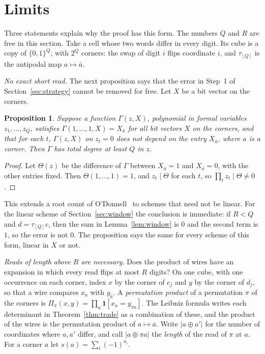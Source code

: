 \documentclass[11pt]{article}
\numberwithin{equation}{section}
\newtheorem{proposition}[theorem]{Proposition}
\theoremstyle{remark}
\newcommand{\bits}{\{0,1\}}
\begin{document}
\section{Limits}\label{sec:limits}

Three statements explain why the proof has this form. The numbers $Q$ and $R$ are free in this section. Take a cell whose two words differ in every digit. Its cube is a copy of $\bits^Q$, with $2^Q$ corners: the swap of digit $i$ flips coordinate $i$, and $\tau_{[Q]}$ is the antipodal map $a\mapsto\bar a$.

\emph{No exact short read.} The next proposition says that the error in Step~1 of Section~\ref{sec:strategy} cannot be removed for free. Let $X$ be a bit vector on the corners.

\begin{proposition}\label{prop:exact}
Suppose a function $\Gamma(z,X)$, polynomial in formal variables $z_1,\dots,z_Q$, satisfies $\Gamma(1,\dots,1,X)=X_{\bar a}$ for all bit vectors $X$ on the corners, and that for each $t$, $\Gamma(z,X)$ on $z_t=0$ does not depend on the entry $X_{\bar a}$, where $a$ is a corner. Then $\Gamma$ has total degree at least $Q$ in $z$.
\end{proposition}
\begin{proof}
Let $\Theta(z)$ be the difference of $\Gamma$ between $X_{\bar a}=1$ and $X_{\bar a}=0$, with the other entries fixed. Then $\Theta(1,\dots,1)=1$, and $z_t\mid\Theta$ for each $t$, so $\prod_tz_t\mid\Theta\ne0$.
\end{proof}

This extends a root count of O'Donnell~\cite[Section~5.1]{OD26} to schemes that need not be linear. For the linear scheme of Section~\ref{sec:window} the conclusion is immediate: if $R<Q$ and $d=\tau_{[Q]}c$, then the sum in Lemma~\ref{lem:window} is $0$ and the second term is $1$, so the error is not $0$. The proposition says the same for every scheme of this form, linear in $X$ or not.

\emph{Reads of length above $R$ are necessary.} Does the product of wires have an expansion in which every read flips at most $R$ digits? On one cube, with one occurrence on each corner, index $x$ by the corner of $c_j$ and $y$ by the corner of $d_j$, so that a wire compares $x_a$ with $y_{\bar a}$. A \emph{permutation product} of a permutation $\pi$ of the corners is $\Pi_\pi(x,y)=\prod_a\mathbf 1[x_a=y_{\pi a}]$. The Leibniz formula writes each determinant in Theorem~\ref{thm:trade} as a combination of these, and the product of the wires is the permutation product of $a\mapsto\bar a$. Write $|a\oplus a'|$ for the number of coordinates where $a,a'$ differ, and call $|a\oplus\pi a|$ the \emph{length} of the read of $\pi$ at $a$. For a corner $a$ let $s(a)=\sum_i(-1)^{a_i}$.
\end{document}
